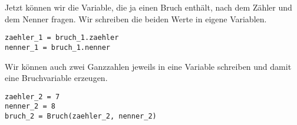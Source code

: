 Jetzt können wir die Variable, die ja einen Bruch enthält, nach dem Zähler und dem Nenner fragen. Wir schreiben die beiden Werte in eigene Variablen.

\begin{lstlisting}
zaehler_1 = bruch_1.zaehler
nenner_1 = bruch_1.nenner
\end{lstlisting}

Wir können auch zwei Ganzzahlen jeweils in eine Variable schreiben und damit eine Bruchvariable erzeugen.

\begin{lstlisting}
zaehler_2 = 7
nenner_2 = 8
bruch_2 = Bruch(zaehler_2, nenner_2)
\end{lstlisting}